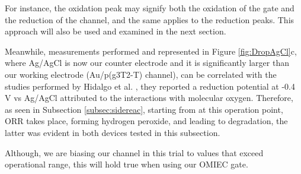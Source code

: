 For instance, the oxidation peak may signify both the oxidation of the gate and the reduction of the channel, and the same applies to the reduction peaks. This approach will also be used and examined in the next section.

Meanwhile, measurements performed and represented in Figure \ref{fig:DropAgCl}c, where Ag/AgCl is now our counter electrode and it is significantly larger than our working electrode (Au/p(g3T2-T) channel), %
can be correlated with the studies performed by Hidalgo et al. \cite{hidalgocastilloSimultaneousPerformanceStability2022a}, they reported a reduction potential at -0.4 V vs Ag/AgCl attributed to the interactions with molecular oxygen. Therefore, as seen in Subsection \ref{subsec:sidereac}, starting from at this operation point, ORR takes place, forming hydrogen peroxide, and leading to degradation, the latter was evident in both devices tested in this subsection.

Although, we are biasing our channel in this trial to values that exceed operational range, this will hold true when using our OMIEC gate. %





